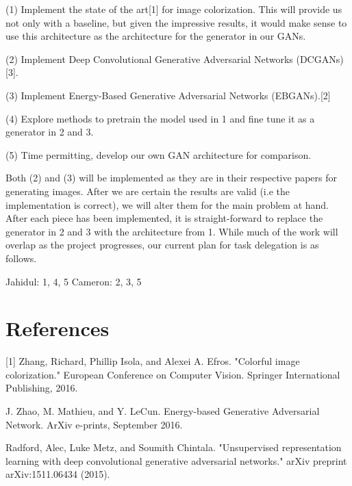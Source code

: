 \documentclass{article}
\begin{document}
\vspace{2pt}
(1) Implement the state of the art[1] for image colorization. This will provide
\indent us not only with a baseline, but given the impressive results, it would make
\indent sense to use this architecture as the architecture for the generator in our
\indent GANs.

\vspace{3pt}
(2) Implement Deep Convolutional Generative Adversarial Networks \newline
\indent (DCGANs)[3]. 

\vspace{3pt}
(3) Implement Energy-Based Generative Adversarial Networks (EBGANs).[2]

\vspace{3pt}
(4) Explore methods to pretrain the model used in 1 and fine tune it as a
\indent generator in 2 and 3.

(5) Time permitting, develop our own GAN architecture for comparison.

\vspace{4pt}

\noindent Both (2) and (3) will be implemented as they are in their respective papers for generating
images. After we are certain the results are valid (i.e the implementation is correct), we will alter
them for the main problem at hand. After each piece has been implemented, it is straight-forward to
replace the generator in 2 and 3 with the architecture from 1. While much of the work will overlap as the
project progresses, our current plan for task delegation is as follows. \newline

\noindent Jahidul: 1, 4, 5 \newline
\noindent Cameron: 2, 3, 5



\section{References}
[1] Zhang, Richard, Phillip Isola, and Alexei A. Efros. "Colorful image colorization." 
European Conference on Computer Vision. Springer International Publishing, 2016.
\vspace{2pt}

\noindent [2] J. Zhao, M. Mathieu, and Y. LeCun.  Energy-based Generative Adversarial 
Network. ArXiv e-prints, September 2016.
\vspace{2pt}

\noindent [3] Radford, Alec, Luke Metz, and Soumith Chintala. "Unsupervised representation learning with deep
convolutional generative adversarial networks." arXiv preprint arXiv:1511.06434 (2015).
\end{document}
